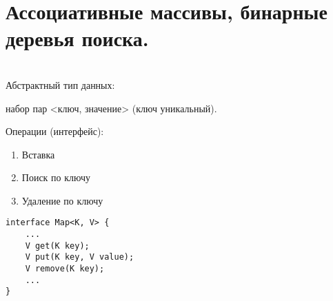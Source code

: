 \section {Ассоциативные массивы, бинарные деревья поиска.}
\\
Абстрактный тип данных:

\qquad набор пар <ключ, значение> (ключ уникальный).

Операции (интерфейс):
\begin{enumerate}
\item Вставка
\item Поиск по ключу
\item Удаление по ключу
\end{enumerate}

\begin{verbatim}
interface Map<K, V> {
    ...
    V get(K key);
    V put(K key, V value);
    V remove(K key);
    ...
}
\end{verbatim}


